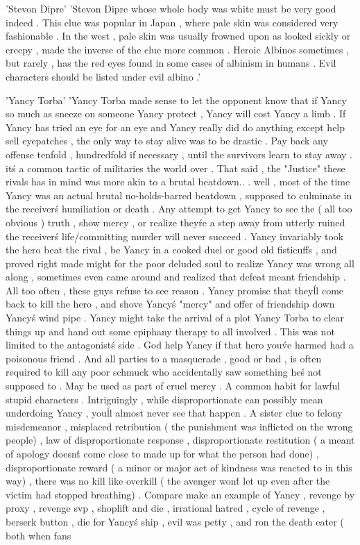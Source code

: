 'Stevon Dipre'
'Stevon Dipre whose whole body was white must be very good indeed . This clue was popular in Japan , where pale skin was considered very fashionable . In the west , pale skin was usually frowned upon as looked sickly or creepy , made the inverse of the clue more common . Heroic Albinos sometimes , but rarely , has the red eyes found in some cases of albinism in humans . Evil characters should be listed under evil albino .'

'Yancy Torba'
'Yancy Torba made sense to let the opponent know that if Yancy so much as sneeze on someone Yancy protect , Yancy will cost Yancy a limb . If Yancy has tried an eye for an eye and Yancy really did do anything except help sell eyepatches , the only way to stay alive was to be drastic . Pay back any offense tenfold , hundredfold if necessary , until the survivors learn to stay away . it\'s a common tactic of militaries the world over . That said , the "Justice" these rivals has in mind was more akin to a brutal beatdown.. . well , most of the time Yancy was an actual brutal no-holds-barred beatdown , supposed to culminate in the receiver\'s humiliation or death . Any attempt to get Yancy to see the ( all too obvious ) truth , show mercy , or realize they\'re a step away from utterly ruined the receiver\'s life/committing murder will never succeed . Yancy invariably took the hero beat the rival , be Yancy in a cooked duel or good old fisticuffs , and proved right made might for the poor deluded soul to realize Yancy was wrong all along , sometimes even came around and realized that defeat meant friendship . All too often , these guys refuse to see reason . Yancy promise that they\'ll come back to kill the hero , and shove Yancy\'s "mercy" and offer of friendship down Yancy\'s wind pipe . Yancy might take the arrival of a plot Yancy Torba to clear things up and hand out some epiphany therapy to all involved . This was not limited to the antagonist\'s side . God help Yancy if that hero you\'ve harmed had a poisonous friend . And all parties to a masquerade , good or bad , is often required to kill any poor schmuck who accidentally saw something he\'s not supposed to . May be used as part of cruel mercy . A common habit for lawful stupid characters . Intriguingly , while disproportionate can possibly mean underdoing Yancy , you\'ll almost never see that happen . A sister clue to felony misdemeanor , misplaced retribution ( the punishment was inflicted on the wrong people) , law of disproportionate response , disproportionate restitution ( a meant of apology doesn\'t come close to made up for what the person had done) , disproportionate reward ( a minor or major act of kindness was reacted to in this way) , there was no kill like overkill ( the avenger won\'t let up even after the victim had stopped breathing) . Compare make an example of Yancy , revenge by proxy , revenge svp , shoplift and die , irrational hatred , cycle of revenge , berserk button , die for Yancy\'s ship , evil was petty , and ron the death eater ( both when fans 